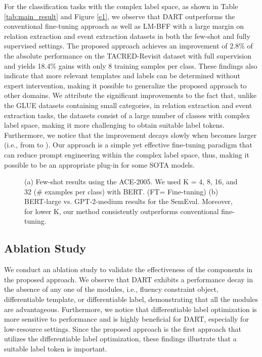 \documentclass{article} \usepackage{iclr2022_conference,times}
\begin{document}
For the classification tasks with the complex label space, as shown in Table \ref{tab:main_result} and Figure \ref{e1}, we observe that DART outperforms the conventional fine-tuning approach as well as LM-BFF with a large margin on relation extraction and event extraction datasets in both the few-shot and fully supervised settings.
The proposed approach achieves an improvement of 2.8\% of the absolute performance on the TACRED-Revisit dataset with full supervision and yields 18.4\% gains with only 8 training samples per class. 
These findings also indicate that more relevant templates and labels can be determined without expert intervention, making it possible to generalize the proposed approach to other domains.
{\color{highlight}
We attribute the significant improvements to the fact that, unlike the GLUE datasets containing small categories, in relation extraction and event extraction tasks, the datasets consist of a large number of classes with complex label space, making it more challenging to obtain suitable label tokens.
}
Furthermore, we notice that the improvement decays slowly when  becomes larger (i.e., from  to ).
Our approach is a simple yet effective fine-tuning paradigm that can reduce prompt engineering within the complex label space, thus, making it possible to be an appropriate plug-in for some SOTA models.

\begin{figure*}[!htbp]
\centering
{}

\caption{
(a) Few-shot results using the ACE-2005.
We used K = 4, 8, 16, and 32 (\# examples per class) with BERT. (FT= Fine-tuning)
(b) BERT-large vs. GPT-2-medium results for the SemEval. 
Moreover, for lower K, our method consistently outperforms conventional fine-tuning.
}
\label{exp2}
\end{figure*}


\subsection{Ablation Study}
We conduct an ablation study to validate the effectiveness of the components in the proposed approach.
We observe that DART exhibits a performance decay in the absence of any one of the modules, i.e., fluency constraint object, differentiable template, or differentiable label, demonstrating that all the modules are advantageous.
Furthermore, we notice that differentiable label optimization is more sensitive to performance and is highly beneficial for DART, especially for low-resource settings. 
Since the proposed approach is the first approach that utilizes the differentiable label optimization, these findings illustrate that a suitable label token is important.
\end{document}
